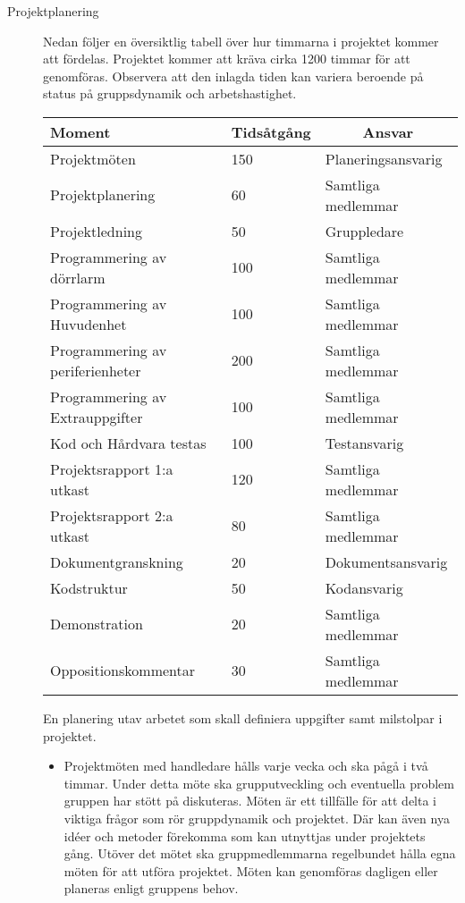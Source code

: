 \documentclass[a4paper]{article}
\begin{document}
\begin{description}
 \item[Projektplanering] Nedan följer en översiktlig tabell över hur timmarna i projektet kommer att fördelas. Projektet kommer att kräva cirka 1200 timmar för att genomföras. Observera att den inlagda tiden kan variera beroende på status på gruppsdynamik och arbetshastighet.

\begin{tabular}{ | p{5.4cm}| p{2cm} |p{4cm}|  }
\hline
  \rowcolor{lightgray}
  \centering Moment & Tidsåtgång & \multicolumn{1}{|c|}{Ansvar} \\
 \hline
 Projektmöten                         & 150  &Planeringsansvarig\\
    \rowcolor{lightgray}
 Projektplanering                    & 60   &Samtliga medlemmar\\
 Projektledning                       & 50   &Gruppledare\\
    \rowcolor{lightgray}
 Programmering av dörrlarm            & 100  &Samtliga medlemmar\\
 Programmering av Huvudenhet          & 100  &Samtliga medlemmar\\
    \rowcolor{lightgray}
 Programmering av periferienheter     & 200  &Samtliga medlemmar\\
 Programmering av Extrauppgifter     & 100  &Samtliga medlemmar\\
    \rowcolor{lightgray}
 Kod och Hårdvara testas              & 100  &Testansvarig\\   
 Projektsrapport 1:a utkast           & 120  &Samtliga medlemmar\\
    \rowcolor{lightgray}
 Projektsrapport 2:a utkast           & 80   &Samtliga medlemmar\\
 Dokumentgranskning                   & 20   &Dokumentsansvarig\\ 
     \rowcolor{lightgray}
 Kodstruktur                          & 50   &Kodansvarig\\
 Demonstration                        & 20   &Samtliga medlemmar \\
 \rowcolor{lightgray}
 Oppositionskommentar                 & 30   &Samtliga medlemmar\\
 \hline
\end{tabular}
 En planering utav arbetet som skall definiera uppgifter samt milstolpar i projektet.


\begin{itemize}
 \item Projektmöten med handledare hålls varje vecka och ska pågå i två timmar. Under detta möte ska grupputveckling och eventuella problem gruppen har stött på diskuteras. Möten är ett tillfälle för att delta i viktiga frågor som rör gruppdynamik och projektet. Där kan även nya idéer och metoder förekomma som kan utnyttjas under projektets gång. Utöver det mötet ska gruppmedlemmarna regelbundet hålla egna möten för att utföra projektet. Möten kan genomföras dagligen eller planeras enligt gruppens behov.


\end{itemize}
\end{description}
\end{document}

